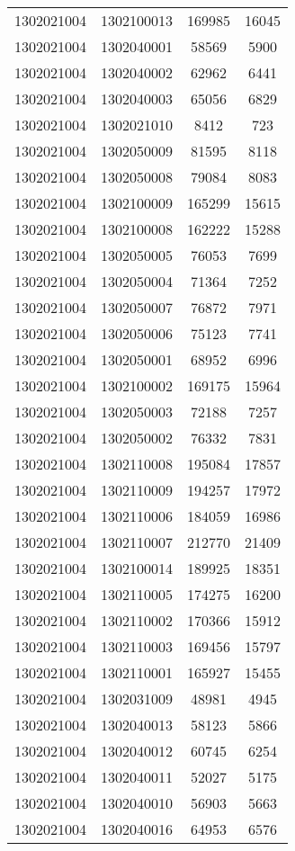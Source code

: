 \begin{longtable}{llcc}
1302021004 & 1302100013 & 169985 & 16045\\
1302021004 & 1302040001 & 58569 & 5900\\
1302021004 & 1302040002 & 62962 & 6441\\
1302021004 & 1302040003 & 65056 & 6829\\
1302021004 & 1302021010 & 8412 & 723\\
1302021004 & 1302050009 & 81595 & 8118\\
1302021004 & 1302050008 & 79084 & 8083\\
1302021004 & 1302100009 & 165299 & 15615\\
1302021004 & 1302100008 & 162222 & 15288\\
1302021004 & 1302050005 & 76053 & 7699\\
1302021004 & 1302050004 & 71364 & 7252\\
1302021004 & 1302050007 & 76872 & 7971\\
1302021004 & 1302050006 & 75123 & 7741\\
1302021004 & 1302050001 & 68952 & 6996\\
1302021004 & 1302100002 & 169175 & 15964\\
1302021004 & 1302050003 & 72188 & 7257\\
1302021004 & 1302050002 & 76332 & 7831\\
1302021004 & 1302110008 & 195084 & 17857\\
1302021004 & 1302110009 & 194257 & 17972\\
1302021004 & 1302110006 & 184059 & 16986\\
1302021004 & 1302110007 & 212770 & 21409\\
1302021004 & 1302100014 & 189925 & 18351\\
1302021004 & 1302110005 & 174275 & 16200\\
1302021004 & 1302110002 & 170366 & 15912\\
1302021004 & 1302110003 & 169456 & 15797\\
1302021004 & 1302110001 & 165927 & 15455\\
1302021004 & 1302031009 & 48981 & 4945\\
1302021004 & 1302040013 & 58123 & 5866\\
1302021004 & 1302040012 & 60745 & 6254\\
1302021004 & 1302040011 & 52027 & 5175\\
1302021004 & 1302040010 & 56903 & 5663\\
1302021004 & 1302040016 & 64953 & 6576\\

\end{longtable}
